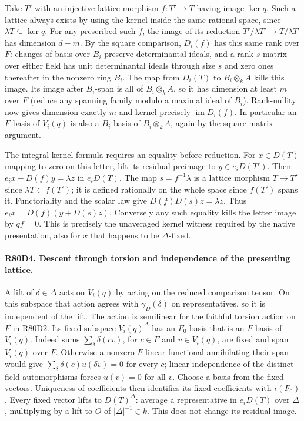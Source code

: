 Take $T'$ with an injective lattice morphism $f:T'\to T$
having image $\ker q$. Such a lattice always exists by using the
kernel inside the same rational space, since $\lambda T\subseteq
\ker q$. For any prescribed such $f$, the image of its reduction
$T'/\lambda T'\to T/\lambda T$ has dimension $d-m$. By the square
comparison, $D_i(f)$ has this same rank over $F$: changes of basis
over $B_i$ preserve determinantal ideals, and a rank-$s$ matrix
over either field has unit determinantal ideals through size $s$
and zero ones thereafter in the nonzero ring $B_i$. The map
from $D_i(T)$ to $B_i\otimes_k A$ kills this image. Its image
after $B_i$-span is all of $B_i\otimes_k A$, so it has dimension
at least $m$ over $F$ (reduce any spanning family modulo a maximal
ideal of $B_i$). Rank-nullity now gives dimension exactly $m$
and kernel precisely $\operatorname{im}D_i(f)$.
In particular an $F$-basis of $V_i(q)$ is also a $B_i$-basis of
$B_i\otimes_k A$, again by the square matrix argument.

The integral kernel formula requires an equality before reduction.
For $x\in D(T)$ mapping to zero on this letter, lift its residual
preimage to $y\in e_iD(T')$. Then
$e_i x-D(f)y=\lambda z$ in $e_iD(T)$. The map $s=f^{-1}\lambda$
is a lattice morphism $T\to T'$ since $\lambda T\subset f(T')$;
it is defined rationally on the whole space since $f(T')$ spans it.
Functoriality and the scalar law give $D(f)D(s)z=\lambda z$.
Thus $e_ix=D(f)(y+D(s)z)$. Conversely any such equality kills
the letter image by $qf=0$. This is precisely the unaveraged
kernel witness required by the native presentation, also for
$x$ that happens to be $\Delta$-fixed.

\paragraph{R80D4. Descent through torsion and independence of the presenting lattice.}
A lift of $\delta\in\Delta$ acts on $V_i(q)$ by acting on the
reduced comparison tensor. On this subspace that action agrees
with $\gamma_D(\delta)$ on representatives, so it is independent
of the lift. The action is semilinear for the faithful torsion
action on $F$ in R80D2. Its fixed subspace $V_i(q)^\Delta$
has an $F_0$-basis that is an $F$-basis of $V_i(q)$.
Indeed sums $\sum_\delta\delta(cv)$, for $c\in F$ and
$v\in V_i(q)$, are fixed and span $V_i(q)$ over $F$.
Otherwise a nonzero $F$-linear functional annihilating their
span would give $\sum_\delta \delta(c)u(\delta v)=0$ for every
$c$; linear independence of the distinct field automorphisms
forces $u(v)=0$ for all $v$. Choose a basis from the fixed vectors.
Uniqueness of coefficients then identifies its fixed coefficients
with $\iota(F_0)$. Every fixed vector lifts to $D(T)^\Delta$:
average a representative in $e_iD(T)$ over $\Delta$, multiplying
by a lift to $O$ of $|\Delta|^{-1}\in k$. This does not change
its residual image.

